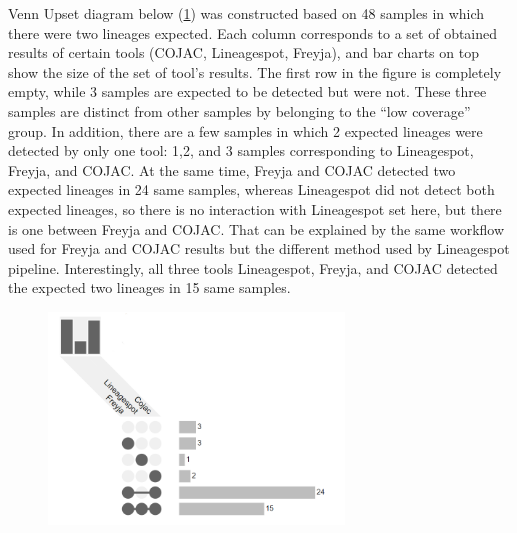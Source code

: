                 Venn Upset diagram below (\cref{fig:results:mock:venn-twolin}) was constructed based on 48 samples in which there were two lineages expected. Each column corresponds to a set of obtained results of certain tools (COJAC, Lineagespot, Freyja), and bar charts on top show the size of the set of tool’s results. The first row in the figure is completely empty, while 3 samples are expected to be detected but were not. These three samples are distinct from other samples by belonging to the “low coverage” group. In addition, there are a few samples in which 2 expected lineages were detected by only one tool: 1,2, and 3 samples corresponding to Lineagespot, Freyja, and COJAC. At the same time, Freyja and COJAC detected two expected lineages in 24 same samples, whereas Lineagespot did not detect both expected lineages, so there is no interaction with Lineagespot set here, but there is one between Freyja and COJAC. That can be explained by the same workflow used for Freyja and COJAC results but the different method used by Lineagespot pipeline. Interestingly, all three tools Lineagespot, Freyja, and COJAC detected the expected two lineages in 15 same samples.
                \begin{figure}[ht!]
                	\centering
                    \includegraphics[width=0.7\textwidth]{figures/results/mock/venn-twolin.png}
                    \label{fig:results:mock:venn-twolin}
                \end{figure}
                
